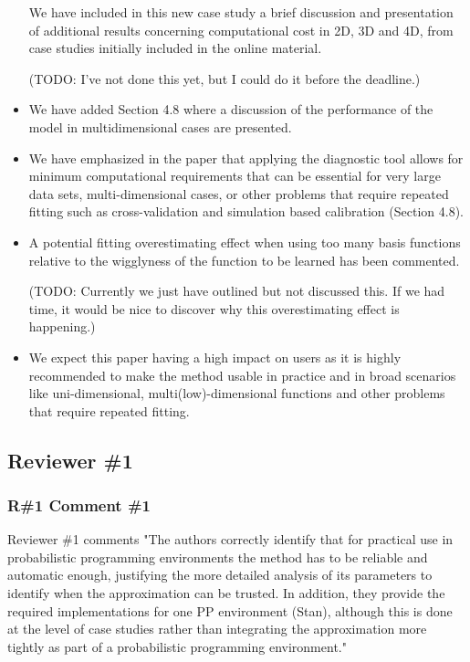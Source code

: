 \documentclass[11pt]{report}
\begin{document}
\begin{itemize}
We have included in this new case study a brief discussion and presentation of additional results concerning computational cost in 2D, 3D and 4D, from case studies initially included in the online material.

{\color{red} (TODO: I've not done this yet, but I could do it before the deadline.)}

\item We have added Section 4.8 where a discussion of the performance of the model in multidimensional cases are presented. 

\item We have emphasized in the paper that applying the diagnostic tool allows for minimum computational requirements that can be essential for very large data sets, multi-dimensional cases, or other problems that require repeated fitting such as cross-validation and simulation based calibration (Section 4.8).

\item A potential fitting overestimating effect when using too many basis functions relative to the wigglyness of the function to be learned has been commented. {\color{red} 

(TODO: Currently we just have outlined but not discussed this. If we had time, it would be nice to discover why this overestimating effect is happening.)}

\item We expect this paper having a high impact on users as it is highly recommended to make the method usable in practice and in broad scenarios like uni-dimensional, multi(low)-dimensional functions and other problems that require repeated fitting.

\end{itemize}

\noindent \hdashrule{12.5cm}{0.2pt}{2mm 1pt}

\subsection*{Reviewer \#1}

\subsubsection*{R\#1 Comment \#1}

Reviewer \#1 comments "The authors correctly identify that for practical use in probabilistic programming environments the method has to be reliable and automatic enough, justifying the more detailed analysis of its parameters to identify when the approximation can be trusted. In addition, they provide the required implementations for one PP environment (Stan), although this is done at the level of case studies rather than integrating the approximation more tightly as part of a probabilistic programming environment."
\end{document}
